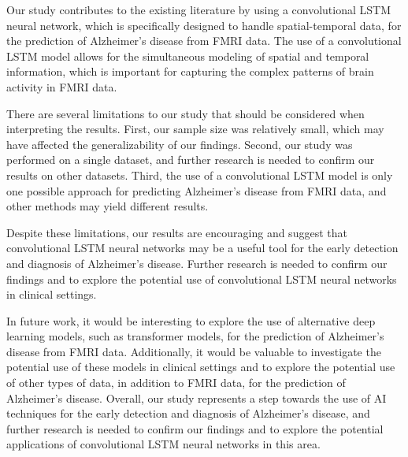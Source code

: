 \documentclass[10pt]{article}
\begin{document}
	Our study contributes to the existing literature by using a convolutional LSTM neural network, which is specifically designed to handle spatial-temporal data, for the prediction of Alzheimer's disease from FMRI data. The use of a convolutional LSTM model allows for the simultaneous modeling of spatial and temporal information, which is important for capturing the complex patterns of brain activity in FMRI data.

	There are several limitations to our study that should be considered when interpreting the results. First, our sample size was relatively small, which may have affected the generalizability of our findings. Second, our study was performed on a single dataset, and further research is needed to confirm our results on other datasets. Third, the use of a convolutional LSTM model is only one possible approach for predicting Alzheimer's disease from FMRI data, and other methods may yield different results.

	Despite these limitations, our results are encouraging and suggest that convolutional LSTM neural networks may be a useful tool for the early detection and diagnosis of Alzheimer's disease. Further research is needed to confirm our findings and to explore the potential use of convolutional LSTM neural networks in clinical settings.

	In future work, it would be interesting to explore the use of alternative deep learning models, such as transformer models, for the prediction of Alzheimer's disease from FMRI data. Additionally, it would be valuable to investigate the potential use of these models in clinical settings and to explore the potential use of other types of data, in addition to FMRI data, for the prediction of Alzheimer's disease. Overall, our study represents a step towards the use of AI techniques for the early detection and diagnosis of Alzheimer's disease, and further research is needed to confirm our findings and to explore the potential applications of convolutional LSTM neural networks in this area.

  
	
	
\end{document}
